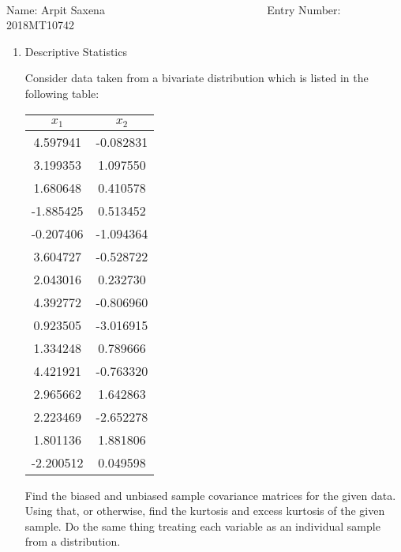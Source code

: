 \documentclass[12pt, oneside]{article}
\begin{document}
\setlength{\textheight}{8.5in}
\\





\vskip 0.5cm

\noindent Name: Arpit Saxena ~  ~~~~~ ~~~~ ~~~~~~~~~~~~~~~~ Entry Number: 2018MT10742 ~~~~~~~~~~~~~



\vskip 0.5cm



\begin{enumerate}

\item	{
    Descriptive Statistics

    Consider data taken from a bivariate distribution which is listed in the following table:

    \begin{center}
      \begin{tabular}{cc}
      \toprule
        \(x_1\) &   \(x_2\) \\
      \midrule
      4.597941 & -0.082831 \\
      3.199353 &  1.097550 \\
      1.680648 &  0.410578 \\
      -1.885425 &  0.513452 \\
      -0.207406 & -1.094364 \\
      3.604727 & -0.528722 \\
      2.043016 &  0.232730 \\
      4.392772 & -0.806960 \\
      0.923505 & -3.016915 \\
      1.334248 &  0.789666 \\
      4.421921 & -0.763320 \\
      2.965662 &  1.642863 \\
      2.223469 & -2.652278 \\
      1.801136 &  1.881806 \\
      -2.200512 &  0.049598 \\
      \bottomrule
      \end{tabular}
    \end{center}

    Find the biased and unbiased sample covariance matrices for the given data. Using that,
    or otherwise, find the kurtosis and excess kurtosis of the given sample. Do the same
    thing treating each variable as an individual sample from a distribution.

}
\end{enumerate}
\end{document}
